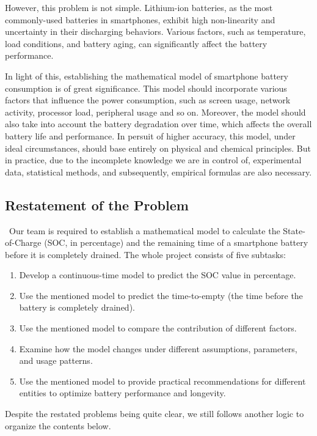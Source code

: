 \documentclass[12pt]{article}
\begin{document}
However, this problem is not simple. Lithium-ion batteries, as the most commonly-used batteries in smartphones, exhibit high non-linearity and uncertainty in their discharging behaviors. Various factors, such as temperature, load conditions, and battery aging, can significantly affect the battery performance. 

In light of this, establishing the mathematical model of smartphone battery consumption is of great significance. This model should incorporate various factors that influence the power consumption, such as screen usage, network activity, processor load, peripheral usage and so on. Moreover, the model should also take into account the battery degradation over time, which affects the overall battery life and performance. In persuit of higher accuracy, this model, under ideal circumstances, should base entirely on physical and chemical principles. But in practice, due to the incomplete knowledge we are in control of, experimental data, statistical methods, and subsequently, empirical formulas are also necessary.

\subsection{Restatement of the Problem}

\quad\, Our team is required to establish a mathematical model to calculate the State-of-Charge (SOC, in percentage) and the remaining time of a smartphone battery before it is completely drained. The whole project consists of five subtasks:

\begin{enumerate}
	\item Develop a continuous-time model to predict the SOC value in percentage.
	\item Use the mentioned model to predict the time-to-empty (the time before the battery is completely drained).
	\item Use the mentioned model to compare the contribution of different factors.
	\item Examine how the model changes under different assumptions, parameters, and usage patterns.
	\item Use the mentioned model to provide practical recommendations for different entities to optimize battery performance and longevity.
\end{enumerate}

Despite the restated problems being quite clear, we still follows another logic to organize the contents below. 
\end{document}
